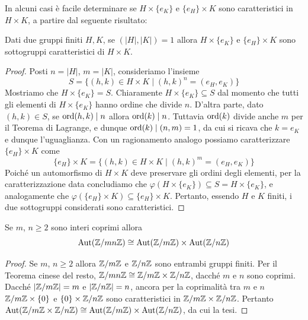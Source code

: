 \documentclass[11pt]{scrartcl}
\begin{document}
	In alcuni casi è facile determinare se $H\times\{e_K\}$ e $\{e_H\}\times K$
	sono caratteristici in $H\times K$, a partire dal seguente risultato:
	
	\begin{proposition}
		Dati due gruppi finiti $H, K$, se $(\lvert H \rvert, \lvert K \rvert) = 1$ allora $H\times\{e_K\}$
		e $\{e_H\}\times K$ sono sottogruppi caratteristici di $H\times K$.
	\end{proposition}
	
	\begin{proof}
		Posti $n = \lvert H \rvert$, $m = \lvert K \rvert$, consideriamo l'insieme
		\[
		S = \{(h, k) \in H\times K\mid (h, k)^n = (e_H, e_K)\}\]
		Mostriamo che $H\times \{e_K\} = S$. Chiaramente 
		$H\times \{e_K\} \subseteq S$ dal momento che tutti gli elementi di $H\times\{e_K\}$
		hanno ordine che divide $n$. D'altra parte, dato $(h, k) \in S$, se
		$\operatorname{ord}(h, k) \mid n$ allora $\operatorname{ord}(k)\mid n$. Tuttavia 
		$\operatorname{ord}(k)$ divide anche $m$ per il Teorema di Lagrange, e dunque
		$\operatorname{ord}(k) \mid (n, m) = 1$, da cui si ricava che $k = e_K$ e dunque l'uguaglianza. Con un ragionamento
		analogo possiamo caratterizzare $\{e_H\} \times K$ come 
		\[
		\{e_H\} \times K = \{(h, k) \in H\times K\mid (h, k)^m = (e_H, e_K)\}
		\] Poiché un automorfismo di $H\times K$ deve preservare gli ordini degli
		elementi, per la caratterizzazione data concludiamo che
		$\varphi(H \times \{e_K\}) \subseteq S = H \times \{e_K\}$, e analogamente
		che $\varphi(\{e_H\} \times K) \subseteq \{e_H\} \times K$. Pertanto,
		essendo $H$ e $K$ finiti, i due sottogruppi considerati sono caratteristici.
	\end{proof}
	
	\begin{corollary}
		Se $m$, $n \geq 2$ sono interi coprimi allora
		\[
		\operatorname{Aut}(\mathbb{Z}/{mn}\mathbb{Z}) \cong \operatorname{Aut}({\mathbb Z}/m{\mathbb Z})\times \operatorname{Aut}({\mathbb Z}/n{\mathbb Z})
		\]
	\end{corollary}
	
	\begin{proof}
		Se $m$, $n \geq 2$ allora $\mathbb{Z}/{m}\mathbb{Z}$ e $\mathbb{Z}/{n}\mathbb{Z}$ sono entrambi gruppi finiti.
		Per il Teorema cinese del resto, $\mathbb{Z}/{mn}\mathbb{Z} \cong \mathbb{Z}/{m}\mathbb{Z} \times \mathbb{Z}/{n}\mathbb{Z}$, dacché
		$m$ e $n$ sono coprimi. Dacché $\left\lvert \mathbb{Z}/{m}\mathbb{Z} \right\rvert = m$ e $\left\lvert \mathbb{Z}/{n}\mathbb{Z} \right\rvert = n$, ancora
		per la coprimalità tra $m$ e $n$
		$\mathbb{Z}/{m}\mathbb{Z} \times \{0\}$ e $\{0\} \times \mathbb{Z}/{n}\mathbb{Z}$ sono caratteristici in
		$\mathbb{Z}/{m}\mathbb{Z} \times \mathbb{Z}/{n}\mathbb{Z}$. Pertanto $\operatorname{Aut}(\mathbb{Z}/{m}\mathbb{Z} \times \mathbb{Z}/{n}\mathbb{Z}) \cong
		\operatorname{Aut}({\mathbb Z}/m{\mathbb Z}) \times \operatorname{Aut}({\mathbb Z}/n{\mathbb Z})$, da cui la tesi.
	\end{proof}
	
\end{document}
